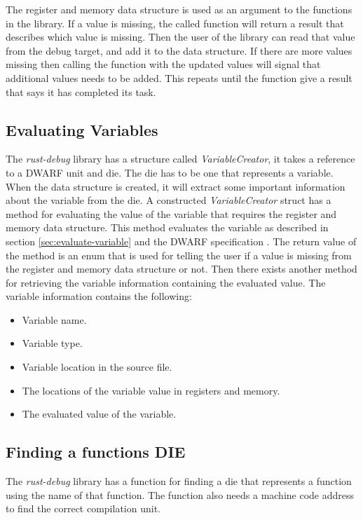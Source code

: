 The register and memory data structure is used as an argument to the functions in the library.
If a value is missing, the called function will return a result that describes which value is missing.
Then the user of the library can read that value from the debug target, and add it to the data structure.
If there are more values missing then calling the function with the updated values will signal that additional values needs to be added.
This repeats until the function give a result that says it has completed its task.


\subsection{Evaluating Variables} \label{sec:ievalvar}
The \emph{rust-debug} library has a structure called \emph{VariableCreator}, it takes a reference to a \gls{DWARF} unit and \gls{die}.
The \gls{die} has to be one that represents a variable.
When the data structure is created, it will extract some important information about the variable from the \gls{die}. A constructed \emph{VariableCreator} struct has a method for evaluating the value of the variable that requires the register and memory data structure.
This method evaluates the variable as described in section \ref{sec:evaluate-variable} and the \gls{DWARF} specification \cite{dwarf}.
The return value of the method is an enum that is used for telling the user if a value is missing from the register and memory data structure or not.
Then there exists another method for retrieving the variable information containing the evaluated value.
The variable information contains the following:

\begin{itemize}
  \item Variable name.
  \item Variable type.
  \item Variable location in the source file.
  \item The locations of the variable value in registers and memory.
  \item The evaluated value of the variable.
\end{itemize}


\subsection{Finding a functions DIE} \label{sec:funcdie}
The \emph{rust-debug} library has a function for finding a \gls{die} that represents a function using the name of that function.
The function also needs a machine code address to find the correct compilation unit.



